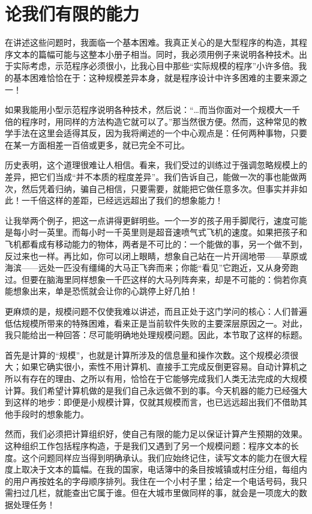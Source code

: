 \documentclass[twoside,11pt,fontset=none]{ctexbook}
\begin{document}
\section[论我们有限的能力]{论我们有限的能力}
\label{sec:our-inability-to-do-much}

在讲述这些问题时，我面临一个基本困难。我真正关心的是大型程序的构造，其程序文本的篇幅可能与这整本小册子相当。同时，我必须用例子来说明各种技术。出于实际考虑，示范程序必须很小，比我心目中那些“实际规模的程序”小许多倍。我的基本困难恰恰在于：这种规模差异本身，就是程序设计中许多困难的主要来源之一！

如果我能用小型示范程序说明各种技术，然后说：“\dots 而当你面对一个规模大一千倍的程序时，用同样的方法构造它就可以了。”那当然很方便。然而，这种常见的教学手法在这里会适得其反，因为我将阐述的一个中心观点是：任何两种事物，只要在某一方面相差一百倍或更多，就已完全不可比。

历史表明，这个道理很难让人相信。看来，我们受过的训练过于强调忽略规模上的差异，把它们当成“并不本质的程度差异”。我们告诉自己，能做一次的事也能做两次，然后凭着归纳，骗自己相信，只要需要，就能把它做任意多次。但事实并非如此！一千倍这样的差距，已经远远超出了我们的想象能力！

让我举两个例子，把这一点讲得更鲜明些。一个一岁的孩子用手脚爬行，速度可能是每小时一英里。而每小时一千英里则是超音速喷气式飞机的速度。如果把孩子和飞机都看成有移动能力的物体，两者是不可比的：一个能做的事，另一个做不到，反过来也一样。再比如，你可以闭上眼睛，想象自己站在一片开阔地带——草原或海滨——远处一匹没有缰绳的大马正飞奔而来；你能“看见”它跑近，又从身旁跑过。但要在脑海里同样想象一千匹这样的大马列阵奔来，却是不可能的：倘若你真能想象出来，单是恐慌就会让你的心跳停上好几拍！

更麻烦的是，规模问题不仅使我难以讲述，而且正处于这门学问的核心：人们普遍低估规模所带来的特殊困难，看来正是当前软件失败的主要深层原因之一。对此，我只能给出一种回答：尽可能明确地处理规模问题。因此，本节取了这样的标题。

首先是计算的“规模”，也就是计算所涉及的信息量和操作次数。这个规模必须很大；如果它确实很小，索性不用计算机、直接手工完成反倒更容易。自动计算机之所以有存在的理由、之所以有用，恰恰在于它能够完成我们人类无法完成的大规模计算。我们希望计算机做的是我们自己永远做不到的事。今天机器的能力已经强大到这样的地步：即便是小规模计算，仅就其规模而言，也已远远超出我们不借助其他手段时的想象能力。

然而，我们必须把计算组织好，使自己有限的能力足以保证计算产生预期的效果。这种组织工作包括程序构造，于是我们又遇到了另一个规模问题：程序文本的长度。这个问题同样应当得到明确承认。我们应始终记住，读写文本的能力在很大程度上取决于文本的篇幅。在我的国家，电话簿中的条目按城镇或村庄分组，每组内的用户再按姓名的字母顺序排列。我住在一个小村子里；给定一个电话号码，我只需扫过几栏，就能查出它属于谁。但在大城市里做同样的事，就会是一项庞大的数据处理任务！
\end{document}
